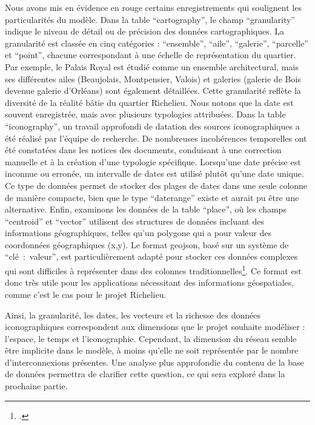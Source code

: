 Nous avons mis en évidence en rouge certains enregistrements qui soulignent les particularités du modèle. Dans la table \enquote{cartography}, le champ \enquote{granularity} indique le niveau de détail ou de précision des données cartographiques. La granularité est classée en cinq catégories : \enquote{ensemble}, \enquote{aile}, \enquote{galerie}, \enquote{parcelle} et \enquote{point}, chacune correspondant à une échelle de représentation du quartier. Par exemple, le Palais Royal est étudié comme un ensemble architectural, mais ses différentes ailes (Beaujolais, Montpensier, Valois) et galeries (galerie de Bois devenue galerie d'Orléans) sont également détaillées. Cette granularité reflète la diversité de la réalité bâtie du quartier Richelieu.
Nous notons que la date est souvent enregistrée, mais avec plusieurs typologies attribuées. Dans la table \enquote{iconography}, un travail approfondi de datation des sources iconographiques a été réalisé par l'équipe de recherche. De nombreuses incohérences temporelles ont été constatées dans les notices des documents, conduisant à une correction manuelle et à la création d'une typologie spécifique. Lorsqu'une date précise est inconnue ou erronée, un intervalle de dates est utilisé plutôt qu'une date unique. Ce type de données permet de stocker des plages de dates dans une seule colonne de manière compacte, bien que le type \enquote{daterange} existe et aurait pu être une alternative.
Enfin, examinons les données de la table \enquote{place}, où les champs \enquote{centroid} et \enquote{vector} utilisent des structures de données incluant des informations géographiques, telles qu'un polygone qui a pour valeur des coordonnées géographiques (x,y). Le format \acrshort{geojson}, basé sur un système de \enquote{clé~:~valeur}, est particulièrement adapté pour stocker ces données complexes qui sont difficiles à représenter dans des colonnes traditionnelles\footcite{Definition2024}. Ce format est donc très utile pour les applications nécessitant des informations géospatiales, comme c'est le cas pour le projet Richelieu.

Ainsi, la granularité, les dates, les vecteurs et la richesse des données iconographiques correspondent aux dimensions que le projet souhaite modéliser : l'espace, le temps et l'iconographie. Cependant, la dimension du réseau semble être implicite dans le modèle, à moins qu'elle ne soit représentée par le nombre d'interconnexions présentes. Une analyse plus approfondie du contenu de la base de données permettra de clarifier cette question, ce qui sera exploré dans la prochaine partie.

